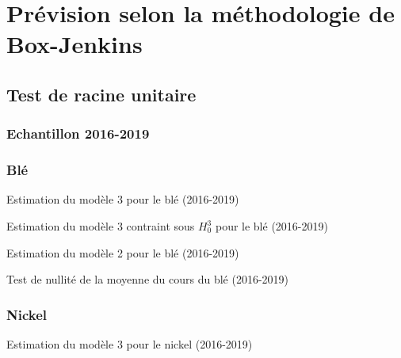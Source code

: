 \documentclass[12pt,a4paper]{article}
\begin{document}
\section{Prévision selon la méthodologie de Box-Jenkins}
\setcounter{table}{0}
\setcounter{figure}{0}
\subsection{Test de racine unitaire}
\subsubsection{Echantillon 2016-2019}
\subsubsection*{Blé}
\begin{table}[H]
    \centering
    \caption{Estimation du modèle 3 pour le blé (2016-2019)}
    \sffamily
    
    \label{tab:mod3_ble19}
\end{table}

\begin{table}[H]
    \centering
    \caption{Estimation du modèle 3 contraint sous $H_{0}^{3}$ pour le blé (2016-2019)}
    \sffamily
    
    \label{tab:mod3cont_ble19}
\end{table}

\begin{table}[H]
    \centering
    \caption{Estimation du modèle 2 pour le blé (2016-2019)}
    \sffamily
    
    \label{tab:mod2_ble19}
\end{table}

\begin{table}[H]
    \centering
    \caption{Test de nullité de la moyenne du cours du blé (2016-2019)}
    \sffamily
    
    \label{tab:testmoy_ble19}
\end{table}

\subsubsection*{Nickel}
\begin{table}[H]
    \centering
    \caption{Estimation du modèle 3 pour le nickel (2016-2019)}
    \sffamily
    
    \label{tab:mod3_nickel19}
\end{table}
\end{document}
